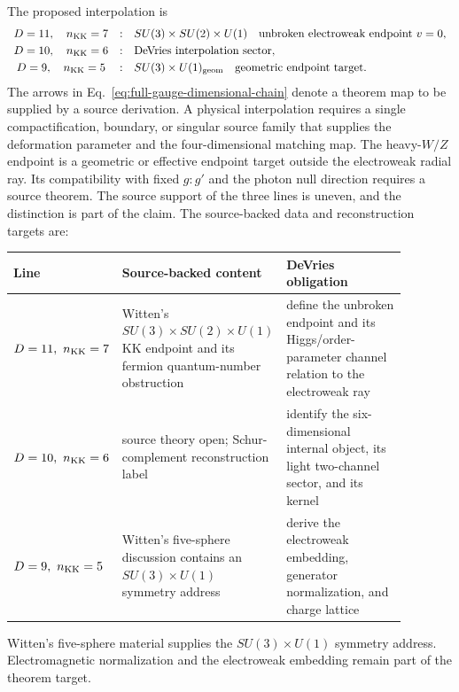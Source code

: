The proposed interpolation is
\begin{equation}
\begin{array}{ccl}
D=11,\quad n_{\rm KK}=7
&:&
SU(3)\times SU(2)\times U(1)
\quad\hbox{unbroken electroweak endpoint }v=0,
\\[3pt]
D=10,\quad n_{\rm KK}=6
&:&
\hbox{DeVries interpolation sector},
\\[3pt]
D=9,\quad n_{\rm KK}=5
&:&
SU(3)\times U(1)_{\rm geom}
\quad\hbox{geometric endpoint target}.
\end{array}
\label{eq:full-gauge-dimensional-chain}
\end{equation}
The arrows in Eq.~\eqref{eq:full-gauge-dimensional-chain} denote a theorem map
to be supplied by a source derivation.  A physical interpolation requires a
single compactification, boundary, or singular source family that supplies the
deformation parameter and the four-dimensional matching map.  The heavy-\(W/Z\)
endpoint is a geometric or effective endpoint target outside the electroweak
radial ray.  Its compatibility with fixed \(g:g'\) and the photon null
direction requires a source theorem.
The source support of the three lines is uneven, and the distinction is part of
the claim.  The source-backed data and reconstruction targets are:
\begin{center}
\small
\begin{tabular}{p{0.20\linewidth}p{0.33\linewidth}p{0.35\linewidth}}
\toprule
Line & Source-backed content & DeVries obligation\\
\midrule
\(D=11,\ n_{\rm KK}=7\) & Witten's \(SU(3)\times SU(2)\times U(1)\)
KK endpoint and its fermion quantum-number obstruction & define the
unbroken endpoint and its Higgs/order-parameter channel relation to the
electroweak ray\\
\(D=10,\ n_{\rm KK}=6\) & source theory open; Schur-complement reconstruction label & identify the
six-dimensional internal object, its light two-channel sector, and its kernel\\
\(D=9,\ n_{\rm KK}=5\) & Witten's five-sphere discussion contains an
\(SU(3)\times U(1)\) symmetry address & derive the electroweak embedding,
generator normalization, and charge lattice\\
\bottomrule
\end{tabular}
\end{center}
Witten's five-sphere material supplies the \(SU(3)\times U(1)\) symmetry
address.  Electromagnetic normalization and the electroweak embedding remain
part of the theorem target.

